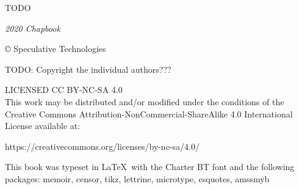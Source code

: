 



\pagestyle{empty}

{
\null\vfill

\begin{flushleft}

{\small
TODO

\textit{2020 Chapbook}


© Speculative Technologies

TODO: Copyright the individual authors???

\bigskip


LICENSED CC BY-NC-SA 4.0 \\
This work may be distributed and/or modified under the conditions of the Creative Commons Attribution-NonCommercial-ShareAlike 4.0 International License available at:
\begin{chatlog}
https://creativecommons.org/licenses/by-nc-sa/4.0/
\end{chatlog}

This book was typeset in \LaTeX\ with the Charter BT font and the following packages:
  memoir,
  censor,
  tikz,
  lettrine,
  microtype,
  csquotes,
  amssmyb

\bigskip

}


\end{flushleft}
}


\clearpage

\titleAM



\frontmatter

{\setlength{\beforechapskip}{0pt}
\begin{KeepFromToc}
  \tableofcontents*
\end{KeepFromToc}
}

\mainmatter
\raggedbottom

\pagestyle{plain}

















